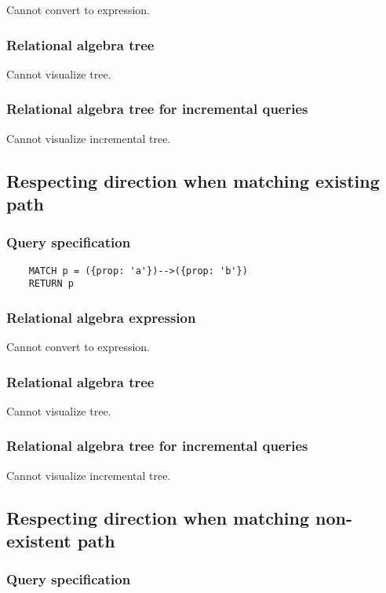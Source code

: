 	Cannot convert to expression.

	\subsubsection*{Relational algebra tree}

	Cannot visualize tree.

	\subsubsection*{Relational algebra tree for incremental queries}

	Cannot visualize incremental tree.
	\subsection{Respecting direction when matching existing path}

	\subsubsection*{Query specification}

	\begin{lstlisting}
	MATCH p = ({prop: 'a'})-->({prop: 'b'})
	RETURN p
	\end{lstlisting}


	\subsubsection*{Relational algebra expression}

	Cannot convert to expression.

	\subsubsection*{Relational algebra tree}

	Cannot visualize tree.

	\subsubsection*{Relational algebra tree for incremental queries}

	Cannot visualize incremental tree.
	\subsection{Respecting direction when matching non-existent path}

	\subsubsection*{Query specification}

